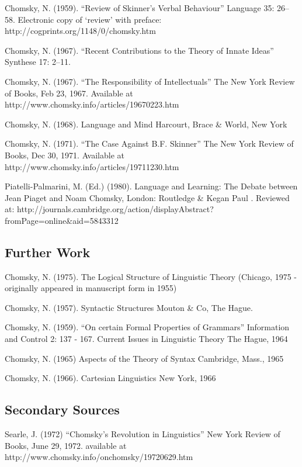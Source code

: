 \begin{refsection}

Chomsky, N. (1959). ``Review of Skinner's Verbal Behaviour'' Language 35: 26--58. Electronic copy of ‘review’ with preface: http:\slash \slash cogprints.org\slash 1148\slash 0\slash chomsky.htm

Chomsky, N. (1967). ``Recent Contributions to the Theory of Innate Ideas'' Synthese 17: 2--11.

Chomsky, N. (1967). “The Responsibility of Intellectuals” The New York Review of Books, Feb 23, 1967. Available at http:\slash \slash www.chomsky.info\slash articles\slash 19670223.htm

Chomsky, N. (1968). Language and Mind Harcourt, Brace \& World, New York

Chomsky, N. (1971). “The Case Against B.F. Skinner” The New York Review of Books, Dec 30, 1971. Available at http:\slash \slash www.chomsky.info\slash articles\slash 19711230.htm

Piatelli-Palmarini, M. (Ed.) (1980). Language and Learning: The Debate between Jean Piaget and Noam Chomsky, London: Routledge \& Kegan Paul . Reviewed at: http:\slash \slash journals.cambridge.org\slash action\slash displayAbstract?fromPage=online\&aid=5843312

\subsection{Further Work}
\label{furtherwork}

Chomsky, N. (1975). The Logical Structure of Linguistic Theory (Chicago, 1975 - originally appeared in manuscript form in 1955)

Chomsky, N. (1957). Syntactic Structures Mouton \& Co, The Hague.

Chomsky, N. (1959). ``On certain Formal Properties of Grammars'' Information and Control 2: 137 - 167. Current Issues in Linguistic Theory The Hague, 1964

Chomsky, N. (1965) Aspects of the Theory of Syntax Cambridge, Mass., 1965

Chomsky, N. (1966). Cartesian Linguistics New York, 1966

\subsection{Secondary Sources}
\label{secondarysources}

Searle, J. (1972) “Chomsky's Revolution in Linguistics” New York Review of Books, June 29, 1972. available at http:\slash \slash www.chomsky.info\slash onchomsky\slash 19720629.htm


\end{refsection}
